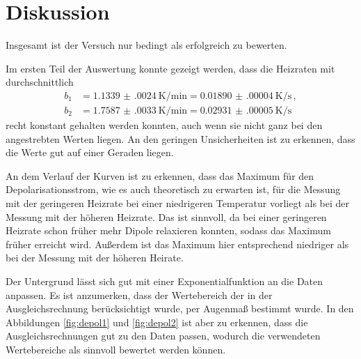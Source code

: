 \newpage
\section{Diskussion}
\label{sec:Diskussion}

Insgesamt ist der Versuch nur bedingt als erfolgreich zu bewerten.

Im ersten Teil der Auswertung konnte gezeigt werden, dass die Heizraten mit
durchschnittlich
\begin{align*}
  b_1&=\SI{1.1339(0024)}{\kelvin\per\minute}= \SI{0.01890(00004)}{\kelvin\per\second}\,, \\
  b_2&=\SI{1.7587(0033)}{\kelvin\per\minute}= \SI{0.02931(00005)}{\kelvin\per\second}\,
\end{align*}
recht konstant gehalten werden konnten, auch wenn sie nicht ganz bei den angestrebten
Werten liegen. An den geringen Unsicherheiten ist zu erkennen, dass die Werte gut auf einer
Geraden liegen.

An dem Verlauf der Kurven ist zu erkennen, dass das Maximum für den Depolarisationsstrom,
wie es auch theoretisch zu erwarten ist, für die Messung mit der geringeren Heizrate bei
einer niedrigeren Temperatur vorliegt als bei der Messung mit der höheren Heizrate. Das ist
sinnvoll, da bei einer geringeren Heizrate schon früher mehr Dipole relaxieren konnten, sodass
das Maximum früher erreicht wird. Außerdem ist das Maximum hier entsprechend niedriger als
bei der Messung mit der höheren Heirate.

Der Untergrund lässt sich gut mit einer Exponentialfunktion an die Daten anpassen.
Es ist anzumerken, dass der Wertebereich der in der Ausgleichsrechnung berücksichtigt wurde,
per Augenmaß bestimmt wurde. In den
Abbildungen \ref{fig:depol1} und \ref{fig:depol2} ist aber zu erkennen, dass die Ausgleichsrechnungen
gut zu den Daten passen, wodurch die verwendeten Wertebereiche als sinnvoll bewertet werden können.

